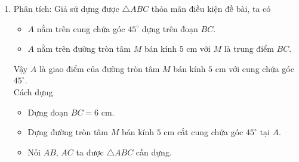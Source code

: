 \begin{bt}
{\begin{enumerate}
{}
Chứng minh. Ta có ngay
\begin{itemize}
	\item $BC=3$ cm theo cách dựng.
	\item $\widehat{A}=50^\circ$ vì $A$ nằm trên cung chứa góc $50^\circ$ dựng trên cạnh $BC$.
	\item $AB=2$ cm, $A$ nằm trên đường tròn tâm $B$ đường kính $2$ cm.
\end{itemize}
Vậy tam giác $ABC$ thỏa mãn điều kiện bài toán.\\
Biện luận: Ta dựng được hai tam giác thỏa mãn yêu cầu là $\triangle ABC$ và $\triangle A'BC$, nhưng hai tam giác này bằng nhau (đối xứng qua $BC$) nên bài toán này chỉ có một nghiệm hình (bài toán này là bài toán dựng hình về kích thước).
\item 
\immini
{Phân tích: Giả sử dựng được $\triangle ABC$ thỏa mãn điều kiện đề bài, ta có
\begin{itemize}
	\item $A$ nằm trên cung chứa góc $45^\circ$ dựng trên đoạn $BC$.
	\item $A$ nằm trên đường tròn tâm $M$ bán kính $5$ cm với $M$ là trung điểm $BC$.
\end{itemize}
Vậy $A$ là giao điểm của đường tròn tâm $M$ bán kính $5$ cm với cung chứa góc $45^\circ$.\\
Cách dựng
\begin{itemize}
	\item Dựng đoạn $BC=6$ cm.
	\item Dựng đường tròn tâm $M$ bán kính $5$ cm cắt cung chứa góc $45^\circ$ tại $A$.
	\item Nối $AB,\,AC$ ta được $\triangle ABC$ cần dựng.
\end{itemize}}
{}
\end{enumerate}}
\end{bt}
